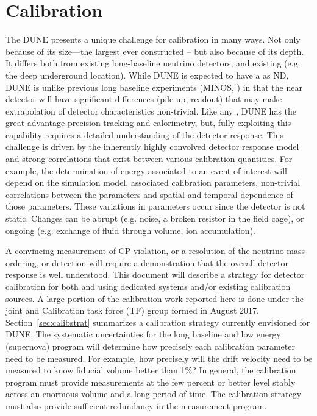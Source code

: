 \chapter{Calibration}
\label{ch:exec-summ-calib}
The DUNE  presents a unique challenge for calibration in many ways. Not only because of its size---the largest  ever constructed -- but also because of its depth. It differs both from existing long-baseline neutrino detectors, and existing  (e.g. the deep underground location). While DUNE is expected to have a  as ND, DUNE is unlike previous long baseline experiments (MINOS, ) in that the near detector will have significant differences (pile-up, readout) that may make extrapolation of detector characteristics non-trivial.  %
Like any , DUNE has the great advantage precision tracking and calorimetry, but,  fully exploiting this capability requires a detailed understanding of the detector response. This challenge is driven by the inherently highly convolved detector response model and strong correlations that exist between various calibration quantities. For example, the determination of energy associated to an event of interest will depend on the simulation model, associated calibration parameters, non-trivial correlations between the parameters and spatial and temporal dependence of those parameters. These variations in parameters occur since the detector is not static. Changes can be abrupt (e.g. noise, a broken resistor in the field cage), or ongoing (e.g. exchange of fluid through volume, ion accumulation). 

A convincing measurement of CP violation, or a resolution of the neutrino mass ordering, or   detection will require a demonstration that the overall detector response is well understood. %
This document will describe a strategy for detector calibration for both 
 and  using dedicated  systems and/or existing calibration sources. A large portion of the calibration work reported here is done under the joint  and  Calibration task force (TF) group formed in August 2017.
Section~\ref{sec:calibstrat} summarizes a calibration strategy currently envisioned for DUNE. The systematic uncertainties for the long baseline and low energy (supernova) program will determine how precisely each calibration parameter need to be measured. For example, how precisely will the drift velocity need to be measured to know fiducial volume better than \num{1}\%? In general, the calibration program must provide measurements at the few percent or better level stably across an enormous volume and a long period of time. The calibration strategy must also provide sufficient redundancy in the measurement program.

